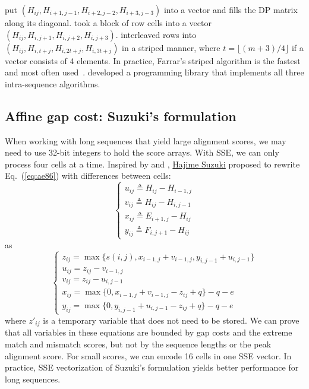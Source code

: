 \documentclass{bioinfo}
\begin{document}
\citet{Wozniak:1997aa} put $(H_{ij},H_{i+1,j-1},H_{i+2,j-2},H_{i+3,j-3})$
into a vector and fills the DP matrix along its diagonal.
\citet{Rognes:2000aa} took a block of row cells into a vector
$(H_{ij},H_{i,j+1},H_{i,j+2},H_{i,j+3})$. \citet{Farrar:2007hs} interleaved rows
into $(H_{ij},H_{i,t+j},H_{i,2t+j},H_{i,3t+j})$ in a striped manner, where
$t=\lfloor(m+3)/4\rfloor$ if a vector consists of 4 elements. In practice,
Farrar's striped algorithm is the fastest and most often
used~\citep{Szalkowski:2008aa,Zhao:2013aa}. \citet{Daily:2016aa} developed a
programming library that implements all three intra-sequence algorithms.

\subsection{Affine gap cost: Suzuki's formulation}

When working with long sequences that yield large alignment scores,
we may need to use 32-bit integers to hold the score arrays. With SSE, we can
only process four cells at a time. Inspired by \citet{Myers:1999aa} and
\citet{Loving:2014aa}, \href{https://github.com/ocxtal}{Hajime Suzuki} proposed
to rewrite Eq.~(\ref{eq:ae86}) with differences between cells:
\begin{equation}
\left\{\begin{array}{l}
u_{ij}\triangleq H_{ij}-H_{i-1,j}\\
v_{ij}\triangleq H_{ij}-H_{i,j-1}\\
x_{ij}\triangleq E_{i+1,j}-H_{ij}\\
y_{ij}\triangleq F_{i,j+1}-H_{ij}
\end{array}\right.
\end{equation}
as
\begin{equation}\label{eq:suzuki}
\left\{\begin{array}{l}
z_{ij}=\max\{s(i,j),x_{i-1,j}+v_{i-1,j},y_{i,j-1}+u_{i,j-1}\}\\
u_{ij}=z_{ij}-v_{i-1,j}\\
v_{ij}=z_{ij}-u_{i,j-1}\\
x_{ij}=\max\{0,x_{i-1,j}+v_{i-1,j}-z_{ij}+q\}-q-e\\
y_{ij}=\max\{0,y_{i,j-1}+u_{i,j-1}-z_{ij}+q\}-q-e
\end{array}\right.
\end{equation}
where $z'_{ij}$ is a temporary variable that does not need to be stored.
We can prove that all variables in these equations are bounded by gap costs and
the extreme match and mismatch scores, but not by the sequence lengths or the
peak alignment score. For small scores, we can encode 16 cells in one SSE
vector. In practice, SSE vectorization of Suzuki's formulation yields better
performance for long sequences.
\end{document}
